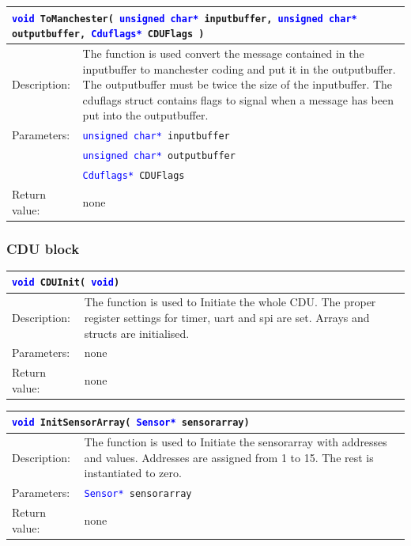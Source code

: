 \begin{table}[H]
\begin{tabular}{l p{12.5cm}}
\multicolumn{2}{p{15cm}}{\texttt{\textcolor{blue}{void} ToManchester( \texttt{\textcolor{blue}{unsigned char*} inputbuffer, \textcolor{blue}{unsigned char*} outputbuffer, \textcolor{blue}{Cduflags*} CDUFlags  }) } } \\
\hline
Description:& The function is used convert the message contained in the inputbuffer to manchester coding and put it in the outputbuffer. The outputbuffer must be twice the size of the inputbuffer. The cduflags struct contains flags to signal when a message has been put into the outputbuffer.\\
Parameters:&\texttt{\textcolor{blue}{unsigned char*} inputbuffer}\\
&\texttt{\textcolor{blue}{unsigned char*} outputbuffer}\\
&\texttt{\textcolor{blue}{Cduflags*} CDUFlags}\\
Return value:&none\\
\end{tabular}
\end{table}

\subsubsection{CDU block}
\begin{table}[H]
\begin{tabular}{l p{12.5cm}}
\multicolumn{2}{l}{\texttt{\textcolor{blue}{void} CDUInit( \texttt{\textcolor{blue}{void}})}} \\
\hline
Description:& The function is used to Initiate the whole CDU. The proper register settings for timer, uart and spi are set. Arrays and structs are initialised.\\
Parameters:&none\\
Return value:&none\\
\end{tabular}
\end{table}

\begin{table}[H]
\begin{tabular}{l p{12.5cm}}
\multicolumn{2}{l}{\texttt{\textcolor{blue}{void} InitSensorArray( \texttt{\textcolor{blue}{Sensor*} sensorarray})}} \\
\hline
Description:& The function is used to Initiate the sensorarray with addresses and values. Addresses are assigned from 1 to 15. The rest is instantiated to zero.\\
Parameters:&\texttt{\textcolor{blue}{Sensor*} sensorarray}\\
Return value:&none\\
\end{tabular}
\end{table}

